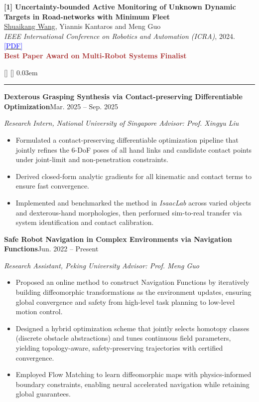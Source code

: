 \documentclass{article}
\newcommand{\SectionFirstScale}{1.25}
\newcommand{\SectionFirstLift}{0.0ex}
\newcommand{\SectionGap}{4pt}
\newcommand{\SectionRule}{0.6pt}
\newcommand{\SectionSize}{11.9552pt}
\newcommand{\SectionLeading}{14.3462pt}
\newcommand{\SectionFont}{\fontsize{\SectionSize}{\SectionLeading}\selectfont}
\newcommand{\entry}[2]{\textbf{#1}\hfill{#2}\par}
\newcommand{\sectionheader}[1]{\vspace{6pt}{\SectionFont\textbf{#1}}\par\vspace{2pt}\hrule\vspace{4pt}}
\renewcommand{\sectionheader}[1]{%
  \vspace{8pt}%
  \StrChar{#1}{1}[\HeaderFirst]%
  \StrGobbleLeft{#1}{1}[\HeaderRest]%
  {\SectionFont\textcolor{HeaderBlue}{%
    \raisebox{\SectionFirstLift}{\scalebox{\SectionFirstScale}{\HeaderFirst}}%
    \kern0.03em
    \HeaderRest
  }}%
  \par\nointerlineskip
  \vspace{\SectionGap}%
  {\color{HeaderBlue}\rule{\linewidth}{\SectionRule}}%
  \vspace{2pt}%
}
\begin{document}
\medskip
\textbf{[1] Uncertainty-bounded Active Monitoring of Unknown Dynamic Targets in Road-networks with Minimum Fleet}\\
\uline{Shuaikang Wang}, Yiannis Kantaros and Meng Guo\\
\textit{IEEE International Conference on Robotics and Automation (ICRA)}, 2024.
\href{https://arxiv.org/pdf/2309.08322}{\textcolor{Blue}{[PDF]}}\\
\textbf{\textcolor{Brown}{Best Paper Award on Multi-Robot Systems Finalist}}

\sectionheader{RESEARCH EXPERIENCE}
\entry{Dexterous Grasping Synthesis via Contact-preserving Differentiable Optimization}{Mar. 2025 -- Sep. 2025}
\vspace{2pt}
\textit{Research Intern, National University of Singapore \hfill Advisor: Prof. Xingyu Liu}
\begin{itemize}[leftmargin=12pt, topsep=2pt, itemsep=0pt]
  \item Formulated a contact-preserving differentiable optimization pipeline that jointly refines the 6-DoF poses of all hand links
  and candidate contact points under joint-limit and non-penetration constraints.
  \item Derived closed-form analytic gradients for all kinematic and contact terms to ensure fast convergence.
  \item Implemented and benchmarked the method in \textit{IsaacLab} across varied objects and dexterous-hand morphologies,
  then performed sim-to-real transfer via system identification and contact calibration.
\end{itemize}

\medskip
\entry{Safe Robot Navigation in Complex Environments via Navigation Functions}{Jun. 2022 -- Present}
\vspace{2pt}
\textit{Research Assistant, Peking University \hfill Advisor: Prof. Meng Guo}
\begin{itemize}[leftmargin=12pt, topsep=2pt, itemsep=0pt]
  \item Proposed an online method to construct Navigation Functions by iteratively building diffeomorphic transformations as the environment updates, ensuring global convergence and safety from high-level task planning to low-level motion control.
  \item Designed a hybrid optimization scheme that jointly selects homotopy classes (discrete obstacle abstractions) and tunes continuous field parameters, yielding topology-aware, safety-preserving trajectories with certified convergence.
  \item Employed Flow Matching to learn diffeomorphic maps with physics-informed boundary constraints, enabling neural accelerated navigation while retaining global guarantees.
\end{itemize}
\end{document}
